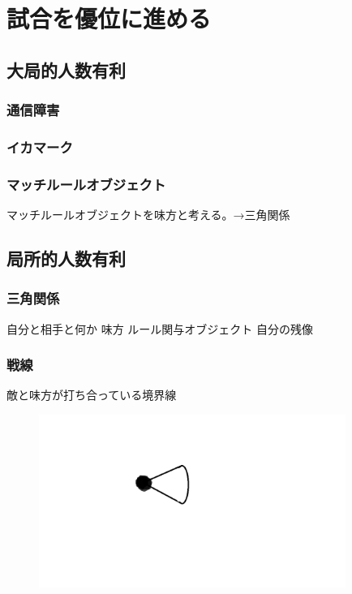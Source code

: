 \documentclass[a4paper,11pt]{jsbook}
\begin{document}
\chapter{試合を優位に進める}
\section{大局的人数有利}
\subsection{通信障害}
\subsection{イカマーク}
\subsection{マッチルールオブジェクト}
マッチルールオブジェクトを味方と考える。→三角関係

\section{局所的人数有利}
\subsection{三角関係}
自分と相手と何か
味方
ルール関与オブジェクト
自分の残像



\subsection{戦線}
敵と味方が打ち合っている境界線
\begin{figure}[h]
  \begin{center}
    \includegraphics[width=10cm]{resoource/player.png}
  \end{center}
\end{figure}
\end{document}
